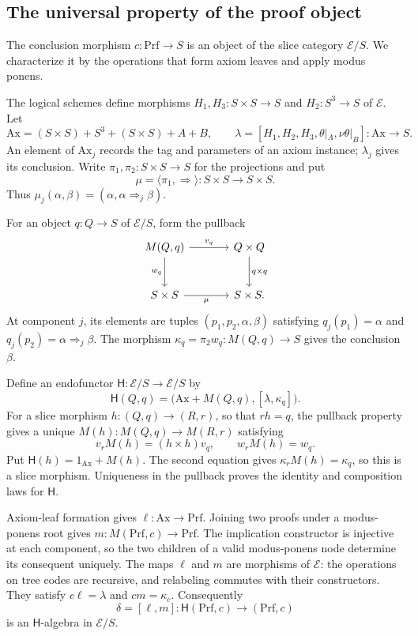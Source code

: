 \documentclass[11pt]{article}
\begin{document}
\subsection{The universal property of the proof object}\label{app:proof-initial}

The conclusion morphism $c:\mathrm{Prf}\to S$ is an object of the
slice category $\mathcal E/S$. We characterize it by the operations
that form axiom leaves and apply modus ponens.

The logical schemes define morphisms
$H_1,H_3:S\times S\to S$ and $H_2:S^3\to S$ of $\mathcal E$.
Let
\[
 \mathrm{Ax}=(S\times S)+S^3+(S\times S)+A+B,
 \qquad
 \lambda=[H_1,H_2,H_3,\theta|_A,\nu\theta|_B]:
       \mathrm{Ax}\longrightarrow S.
\]
An element of $\mathrm{Ax}_j$ records the tag and parameters of an
axiom instance; $\lambda_j$ gives its conclusion.
Write $\pi_1,\pi_2:S\times S\to S$ for the projections and put
\[
 \mu=\langle\pi_1,\Rightarrow\rangle:S\times S\longrightarrow S\times S.
\]
Thus $\mu_j(\alpha,\beta)=(\alpha,\alpha\Rightarrow_j\beta)$.

For an object $q:Q\to S$ of $\mathcal E/S$, form the pullback
\[
\begin{tikzcd}[column sep=large,row sep=large]
 M(Q,q) \arrow[r,"v_q"] \arrow[d,"w_q"'] &
 Q\times Q \arrow[d,"q\times q"] \\
 S\times S \arrow[r,"\mu"'] & S\times S.
\end{tikzcd}
\]
At component $j$, its elements are tuples
$(p_1,p_2,\alpha,\beta)$ satisfying
$q_j(p_1)=\alpha$ and
$q_j(p_2)=\alpha\Rightarrow_j\beta$.
The morphism
$\kappa_q=\pi_2w_q:M(Q,q)\to S$ gives the conclusion $\beta$.

Define an endofunctor $\mathsf H:\mathcal E/S\to\mathcal E/S$ by
\[
 \mathsf H(Q,q)=
 \bigl(\mathrm{Ax}+M(Q,q),[\lambda,\kappa_q]\bigr).
\]
For a slice morphism $h:(Q,q)\to(R,r)$, so that $rh=q$,
the pullback property gives a unique
$M(h):M(Q,q)\to M(R,r)$ satisfying
\[
 v_rM(h)=(h\times h)v_q,\qquad w_rM(h)=w_q.
\]
Put $\mathsf H(h)=1_{\mathrm{Ax}}+M(h)$.
The second equation gives $\kappa_rM(h)=\kappa_q$, so this is a
slice morphism. Uniqueness in the pullback proves the identity and
composition laws for $\mathsf H$.

Axiom-leaf formation gives $\ell:\mathrm{Ax}\to\mathrm{Prf}$.
Joining two proofs under a modus-ponens root gives
$m:M(\mathrm{Prf},c)\to\mathrm{Prf}$.
The implication constructor is injective at each component, so the two
children of a valid modus-ponens node determine its consequent uniquely.
The maps $\ell$ and $m$ are morphisms of $\mathcal E$: the operations on tree codes
are recursive, and relabeling commutes with their constructors.
They satisfy $c\ell=\lambda$ and $cm=\kappa_c$.
Consequently
\[
 \delta=[\ell,m]:\mathsf H(\mathrm{Prf},c)
                     \longrightarrow(\mathrm{Prf},c)
\]
is an $\mathsf H$-algebra in $\mathcal E/S$.
\end{document}
